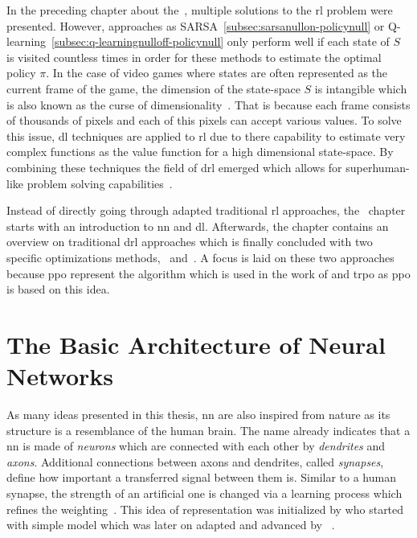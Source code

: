 \documentclass[draft,final]{vutinfth} %
\begin{document}
    In the preceding chapter about the~, multiple solutions to the \gls{rl} problem were presented.
    However, approaches as SARSA~\eqref{subsec:sarsanullon-policynull} or Q-learning~\eqref{subsec:q-learningnulloff-policynull} only perform well if each state of $\mathit{S}$ is visited countless times in order for these methods to estimate the optimal policy $\pi$.
    In the case of video games where states are often represented as the current frame of the game, the dimension of the state-space $\mathit{S}$ is intangible which is also known as the curse of dimensionality~\citep{goodfellow_deep_2016}.
    That is because each frame consists of thousands of pixels and each of this pixels can accept various values.
    To solve this issue, \gls{dl} techniques are applied to \gls{rl} due to there capability to estimate very complex functions as the value function for a high dimensional state-space.
    By combining these techniques the field of \gls{drl} emerged which allows for superhuman-like problem solving capabilities~\citep{francois-lavet_introduction_2018}.

    Instead of directly going through adapted traditional \gls{rl} approaches, the~ chapter starts with an introduction to \gls{nn} and \gls{dl}.
    Afterwards, the chapter contains an overview on traditional \gls{drl} approaches which is finally concluded with two specific optimizations methods,~ and~.
    A focus is laid on these two approaches because \gls{ppo} represent the algorithm which is used in the work of \citeauthor{burda_large-scale_2018-1} and \gls{trpo} as \gls{ppo} is based on this idea.


    \section{The Basic Architecture of Neural Networks}\label{subsec:the-basic-architecture-of-neural-networks}


    As many ideas presented in this thesis, \gls{nn} are also inspired from nature as its structure is a resemblance of the human brain.
    The name already indicates that a \gls{nn} is made of \textit{neurons} which are connected with each other by \textit{dendrites} and \textit{axons}.
    Additional connections between axons and dendrites, called \textit{synapses}, define how important a transferred signal between them is.
    Similar to a human synapse, the strength of an artificial one is changed via a learning process which refines the weighting~\citep{aggarwal_neural_2018}.
    This idea of representation was initialized by \citeauthor{mcculloch_logical_1943} who started with simple model which was later on adapted and advanced by \citeauthor{rosenblatt_perceptron_1957}~\citep{goodfellow_deep_2016}.
\end{document}
